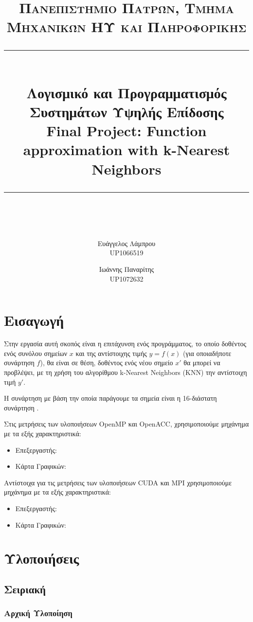 \documentclass[11pt]{scrartcl} %
\title{	
	\normalfont\normalsize
	\textsc{Πανεπιστήμιο Πατρών, Τμήμα Μηχανικών ΗΥ και Πληροφορικής}\\ %
	\vspace{25pt} %
	\rule{\linewidth}{0.5pt}\\ %
	\vspace{20pt} %
    {\Large Λογισμικό και Προγραμματισμός Συστημάτων Υψηλής Επίδοσης \\ \textbf{Final Project:} Function approximation with k-Nearest Neighbors}\\ %
	\vspace{12pt} %
	\rule{\linewidth}{2pt}\\ %
	\vspace{12pt} %
}
\author{Ευάγγελος Λάμπρου \\UP1066519 \and Ιωάννης Παναρίτης \\UP1072632} %
\date{} %
\begin{document}
\maketitle 
\tableofcontents

\section{Εισαγωγή}

Στην εργασία αυτή σκοπός είναι η επιτάχυνση ενός προγράμματος, το οποίο
δοθέντος ενός συνόλου σημείων $x$ και της αντίστοιχης τιμής $y = f(x)$ (για οποιαδήποτε συνάρτηση $f$), 
θα είναι σε θέση, δοθέντος ενός νέου σημείο $x'$ θα μπορεί να προβλέψει, με τη χρήση του αλγορίθμου 
k-Nearest Neighbors (KNN) την αντίστοιχη τιμή $y'$.

Η συνάρτηση με βάση την οποία παράγουμε τα σημεία είναι η 16-διάστατη συνάρτηση .

Στις μετρήσεις των υλοποιήσεων OpenMP και OpenACC, χρησιμοποιούμε μηχάνημα με τα εξής χαρακτηριστικά:
\begin{itemize}
    \item Επεξεργαστής: 
    \item Κάρτα Γραφικών: 
\end{itemize}

Αντίστοιχα για τις μετρήσεις των υλοποιήσεων CUDA και MPI χρησιμοποιούμε μηχάνημα με τα εξής χαρακτηριστικά:

\begin{itemize}
    \item Επεξεργαστής: 
    \item Κάρτα Γραφικών: 
\end{itemize}



\section{Υλοποιήσεις}

\subsection{Σειριακή}

\subsubsection{Αρχική Υλοποίηση}
\end{document}
